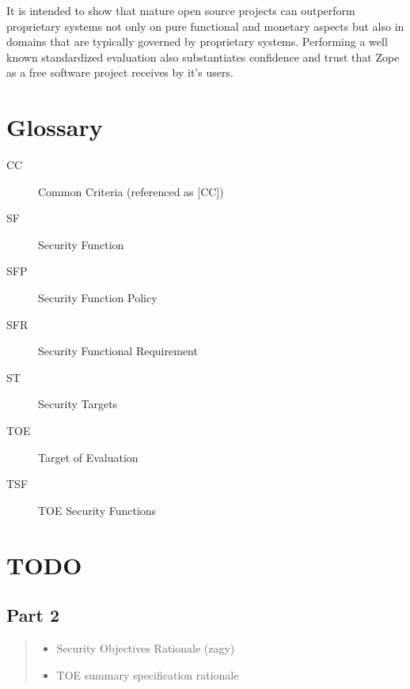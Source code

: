 \documentclass[12pt,english]{scrbook}
\begin{document}
It is intended to show that mature open source projects can outperform
proprietary systems not only on pure functional and monetary aspects but also
in domains that are typically governed by proprietary systems. Performing a
well known standardized evaluation also substantiates confidence and trust that
Zope as a free software project receives by it's users.




\chapter{Glossary}

\begin{description}

  \item[CC] Common Criteria (referenced as {[}CC])
  \item[SF] Security Function
  \item[SFP] Security Function Policy
  \item[SFR] Security Functional Requirement
  \item[ST] Security Targets
  \item[TOE] Target of Evaluation
  \item[TSF] TOE Security Functions

\end{description} 




\chapter{TODO}


\section{Part 2}
\begin{quote}
\begin{itemize}

\item {} 
Security Objectives Rationale (zagy)

\item {} 
TOE summary specification rationale

\end{itemize}
\end{quote}
\end{document}
